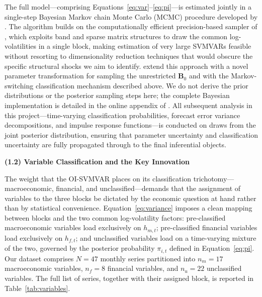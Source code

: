 The full model---comprising Equations~\eqref{eq:var}--\eqref{eq:pi}---is estimated jointly in a single-step Bayesian Markov chain Monte Carlo (MCMC) procedure developed by \citet{davidson2025investigating}. The algorithm builds on the computationally efficient precision-based sampler of \citet{cross2023large}, which exploits band and sparse matrix structures to draw the common log-volatilities in a single block, making estimation of very large SVMVARs feasible without resorting to dimensionality reduction techniques that would obscure the specific structural shocks we aim to identify. \citet{davidson2025investigating} extend this approach with a novel parameter transformation for sampling the unrestricted $\mathbf{B}_0$ and with the Markov-switching classification mechanism described above. We do not derive the prior distributions or the posterior sampling steps here; the complete Bayesian implementation is detailed in the online appendix of \citet{davidson2025investigating}. All subsequent analysis in this project---time-varying classification probabilities, forecast error variance decompositions, and impulse response functions---is conducted on draws from the joint posterior distribution, ensuring that parameter uncertainty and classification uncertainty are fully propagated through to the final inferential objects.

\bigskip

\noindent\textbf{(1.2) Variable Classification and the Key Innovation}

\medskip

The weight that the OI-SVMVAR places on its classification trichotomy---macroeconomic, financial, and unclassified---demands that the assignment of variables to the three blocks be dictated by the economic question at hand rather than by statistical convenience. Equation~\eqref{eq:variance} imposes a clean mapping between blocks and the two common log-volatility factors: pre-classified macroeconomic variables load exclusively on $h_{m,t}$; pre-classified financial variables load exclusively on $h_{f,t}$; and unclassified variables load on a time-varying mixture of the two, governed by the posterior probability $\pi_{i,t}$ defined in Equation~\eqref{eq:pi}. Our dataset comprises $N = 47$ monthly series partitioned into $n_m = 17$ macroeconomic variables, $n_f = 8$ financial variables, and $n_u = 22$ unclassified variables. The full list of series, together with their assigned block, is reported in Table~\ref{tab:variables}.

